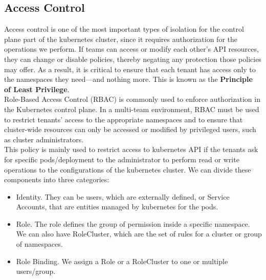 \subsection{Access Control}
\label{subsec:access control}
Access control is one of the most important types of isolation for the control plane part of the kubernetes cluster, since it requires authorization for the operations we perform.
If teams can access or modify each other’s API resources, they can change or disable policies, thereby negating any protection those policies may offer. 
As a result, it is critical to ensure that each tenant has access only to the namespaces they need—and nothing more. This is known as the \textbf{Principle of Least Privilege}. \\
Role-Based Access Control (RBAC) is commonly used to enforce authorization in the Kubernetes control plane. In a multi-team environment, RBAC must be used to restrict tenants’ access to the appropriate namespaces and to ensure that cluster-wide resources can only be accessed or modified by privileged users, such as cluster administrators. \\ 
This policy is mainly used to restrict access to kubernetes API if the tenants ask for specific pods/deployment to the administrator to perform read or write operations to the configurations of the kubernetes cluster. We can divide these components into three categories:
\begin{itemize}
    \item Identity. They can be users, which are externally defined, or Service Accounts, that are entities managed by kubernetes for the pods.
    \item Role. The role defines the group of permission inside a specific namespace. We can also have RoleCluster, which are the set of rules for a cluster or group of namespaces.
    \item Role Binding. We assign a Role or a RoleCluster to one or multiple users/group.
\end{itemize}
